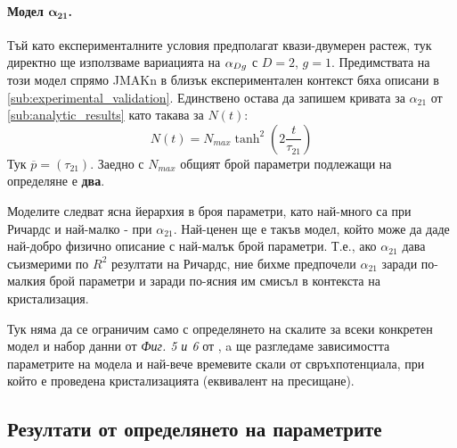 \paragraph{Модел $\boldsymbol{\alpha_{21}}$.} Тъй като експерименталните условия предполагат квази-двумерен растеж, тук директно ще използваме вариацията на $\alpha_{Dg}$ с $D = 2$, $g = 1$. Предимствата на този модел спрямо JMAKn в близък експериментален контекст  бяха описани в \autoref{sub:experimental_validation}. Единствено остава да запишем кривата за $\alpha_{21}$ от \autoref{sub:analytic_results} като такава за $N(t)$:
\begin{equation}
    \label{eq:alpha21_intform_n}
    N(t) = N_{max} \tanh^2{\left( 2 \frac{t}{\tau_{21}} \right)}
\end{equation}
Тук $\overline{p} = (\tau_{21})$. Заедно с $N_{max}$ общият брой параметри подлежащи на определяне е \textbf{два}.

Моделите следват ясна йерархия в броя параметри, като най-много са при Ричардс и най-малко - при $\alpha_{21}$. Най-ценен ще е такъв модел, който може да даде най-добро физично описание с най-малък брой параметри. Т.е., ако $\alpha_{21}$ дава съизмерими по $R^2$ резултати на Ричардс, ние бихме предпочели $\alpha_{21}$ заради по-малкия брой параметри и заради по-ясния им смисъл в контекста на кристализация.

Тук няма да се ограничим само с определянето на скалите за всеки конкретен модел и набор данни от \textit{Фиг. 5 и 6} от \cite{Markov1976}, a ще разгледаме зависимостта параметрите на модела и най-вече времевите скали от свръхпотенциала, при който е проведена кристализацията (еквивалент на пресищане).

\subsection{Резултати от определянето на параметрите}
